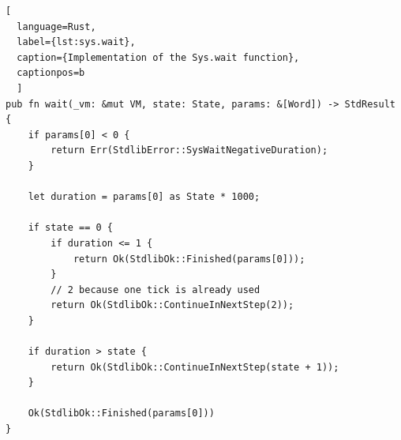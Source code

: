 \begin{lstlisting}[
  language=Rust,
  label={lst:sys.wait},
  caption={Implementation of the Sys.wait function},
  captionpos=b
  ]
pub fn wait(_vm: &mut VM, state: State, params: &[Word]) -> StdResult {
    if params[0] < 0 {
        return Err(StdlibError::SysWaitNegativeDuration);
    }

    let duration = params[0] as State * 1000;

    if state == 0 {
        if duration <= 1 {
            return Ok(StdlibOk::Finished(params[0]));
        }
        // 2 because one tick is already used
        return Ok(StdlibOk::ContinueInNextStep(2));
    }

    if duration > state {
        return Ok(StdlibOk::ContinueInNextStep(state + 1));
    }

    Ok(StdlibOk::Finished(params[0]))
}
\end{lstlisting}

